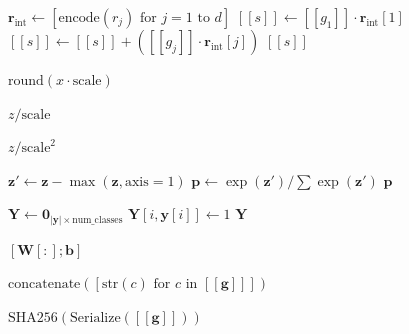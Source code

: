 \documentclass[10pt,journal,compsoc]{IEEEtran}
\begin{document}
\begin{algorithm}[H]
\caption{Cryptographic Primitives and Utility Functions}
\label{alg:utils}
\begin{algorithmic}[1]

    \State $\mathbf{r}_{\text{int}} \gets [\text{encode}(r_j) \text{ for } j = 1 \text{ to } d]$
    \State $[\![s]\!] \gets [\![g_1]\!] \cdot \mathbf{r}_{\text{int}}[1]$
        \State $[\![s]\!] \gets [\![s]\!] + ([\![g_j]\!] \cdot \mathbf{r}_{\text{int}}[j])$
    \EndFor
    \State \Return $[\![s]\!]$
\EndFunction

    \State \Return $\text{round}(x \cdot \text{scale})$
\EndFunction

    \State \Return $z / \text{scale}$
\EndFunction

    \State \Return $z / \text{scale}^2$
\EndFunction

    \State $\mathbf{z}' \gets \mathbf{z} - \max(\mathbf{z}, \text{axis}=1)$
    \State $\mathbf{p} \gets \exp(\mathbf{z}') / \sum \exp(\mathbf{z}')$
    \State \Return $\mathbf{p}$
\EndFunction

    \State $\mathbf{Y} \gets \mathbf{0}_{|\mathbf{y}| \times \text{num\_classes}}$
        \State $\mathbf{Y}[i, \mathbf{y}[i]] \gets 1$
    \EndFor
    \State \Return $\mathbf{Y}$
\EndFunction

    \State \Return $[\mathbf{W}[:]; \mathbf{b}]$
\EndFunction

    \State \Return $\text{concatenate}([ \text{str}(c) \text{ for } c \text{ in } [\![\mathbf{g}]\!] ])$
\EndFunction

    \State \Return $\text{SHA256}(\text{Serialize}([\![\mathbf{g}]\!]))$
\EndFunction
\end{algorithmic}
\end{algorithm}

\end{document}

